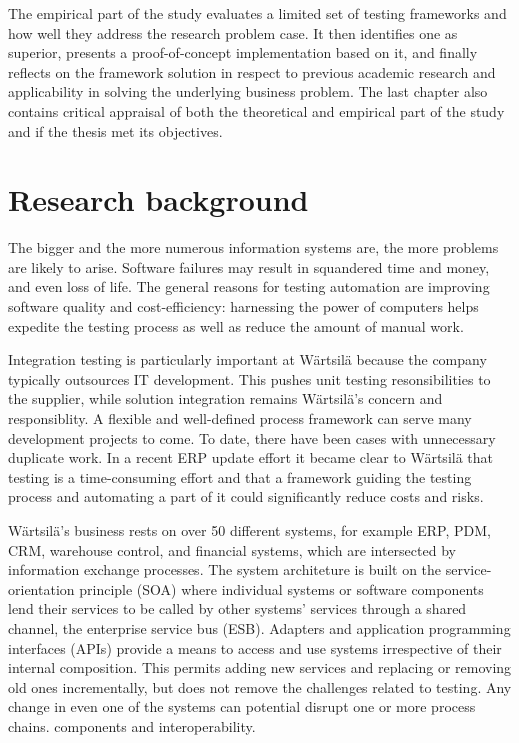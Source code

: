 \documentclass[12pt,a4paper,oneside,pdftex]{report}
\begin{document}
The empirical part of the study evaluates a limited set of testing frameworks and how well they address the research problem case. It then identifies one as superior, presents a proof-of-concept implementation based on it, and finally reflects on the framework solution in respect to previous academic research and applicability in solving the underlying business problem. The last chapter also contains critical appraisal of both the theoretical and empirical part of the study and if the thesis met its objectives.

\chapter{Research background}
\label{chapter:background}

The bigger and the more numerous information systems are, the more problems are likely to arise. Software failures may result in squandered time and money, and even loss of life. The general reasons for testing automation are improving software quality and cost-efficiency: harnessing the power of computers helps expedite the testing process as well as reduce the amount of manual work. \citep{laukkanen2006data}

Integration testing is particularly important at Wärtsilä because the company typically outsources IT development. This pushes unit testing resonsibilities to the supplier, while solution integration remains Wärtsilä's concern and responsiblity. A flexible and well-defined process framework can serve many development projects to come. To date, there have been cases with unnecessary duplicate work. In a recent ERP update effort it became clear to Wärtsilä that testing is a time-consuming effort and that a framework guiding the testing process and automating a part of it could significantly reduce costs and risks.

Wärtsilä's business rests on over 50 different systems, for example ERP, PDM, CRM, warehouse control, and financial systems, which are intersected by information exchange processes. The system architeture is built on the service-orientation principle (SOA) where individual systems or software components lend their services to be called by other systems' services through a shared channel, the enterprise service bus (ESB). Adapters and application programming interfaces (APIs) provide a means to access and use systems irrespective of their internal composition. This permits adding new services and replacing or removing old ones incrementally, but does not remove the challenges related to testing. Any change in even one of the systems can potential disrupt one or more process chains. 
components and interoperability.
\end{document}
